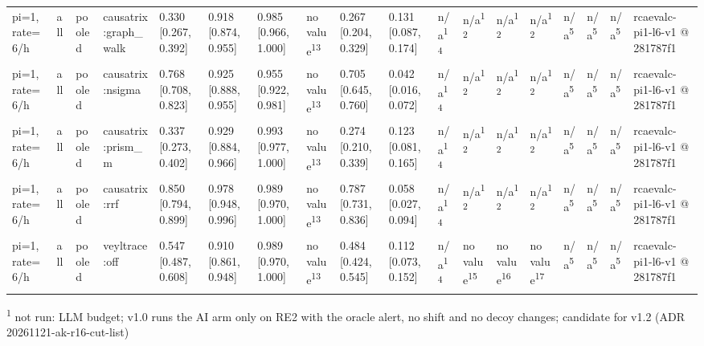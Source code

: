 \begin{table}[t]
\begin{tabular}{llllllllllllllllll}
pi=1, rate=6/h & all & pooled & causatrix:graph\_walk & 0.330 [0.267, 0.392] & 0.918 [0.874, 0.955] & 0.985 [0.966, 1.000] & no value\textsuperscript{13} & 0.267 [0.204, 0.329] & 0.131 [0.087, 0.174] & n/a\textsuperscript{14} & n/a\textsuperscript{12} & n/a\textsuperscript{12} & n/a\textsuperscript{12} & n/a\textsuperscript{5} & n/a\textsuperscript{5} & n/a\textsuperscript{5} & rcaevalc-pi1-l6-v1 @ 281787f1 \\
pi=1, rate=6/h & all & pooled & causatrix:nsigma & 0.768 [0.708, 0.823] & 0.925 [0.888, 0.955] & 0.955 [0.922, 0.981] & no value\textsuperscript{13} & 0.705 [0.645, 0.760] & 0.042 [0.016, 0.072] & n/a\textsuperscript{14} & n/a\textsuperscript{12} & n/a\textsuperscript{12} & n/a\textsuperscript{12} & n/a\textsuperscript{5} & n/a\textsuperscript{5} & n/a\textsuperscript{5} & rcaevalc-pi1-l6-v1 @ 281787f1 \\
pi=1, rate=6/h & all & pooled & causatrix:prism\_m & 0.337 [0.273, 0.402] & 0.929 [0.884, 0.966] & 0.993 [0.977, 1.000] & no value\textsuperscript{13} & 0.274 [0.210, 0.339] & 0.123 [0.081, 0.165] & n/a\textsuperscript{14} & n/a\textsuperscript{12} & n/a\textsuperscript{12} & n/a\textsuperscript{12} & n/a\textsuperscript{5} & n/a\textsuperscript{5} & n/a\textsuperscript{5} & rcaevalc-pi1-l6-v1 @ 281787f1 \\
pi=1, rate=6/h & all & pooled & causatrix:rrf & 0.850 [0.794, 0.899] & 0.978 [0.948, 0.996] & 0.989 [0.970, 1.000] & no value\textsuperscript{13} & 0.787 [0.731, 0.836] & 0.058 [0.027, 0.094] & n/a\textsuperscript{14} & n/a\textsuperscript{12} & n/a\textsuperscript{12} & n/a\textsuperscript{12} & n/a\textsuperscript{5} & n/a\textsuperscript{5} & n/a\textsuperscript{5} & rcaevalc-pi1-l6-v1 @ 281787f1 \\
pi=1, rate=6/h & all & pooled & veyltrace:off & 0.547 [0.487, 0.608] & 0.910 [0.861, 0.948] & 0.989 [0.970, 1.000] & no value\textsuperscript{13} & 0.484 [0.424, 0.545] & 0.112 [0.073, 0.152] & n/a\textsuperscript{14} & no value\textsuperscript{15} & no value\textsuperscript{16} & no value\textsuperscript{17} & n/a\textsuperscript{5} & n/a\textsuperscript{5} & n/a\textsuperscript{5} & rcaevalc-pi1-l6-v1 @ 281787f1 \\
\hline
\end{tabular}
\par\smallskip\footnotesize
\textsuperscript{1} not run: LLM budget; v1.0 runs the AI arm only on RE2 with the oracle alert, no shift and no decoy changes; candidate for v1.2 (ADR 20261121-ak-r16-cut-list)\\

\end{table}

